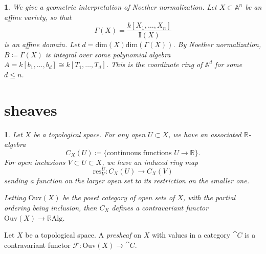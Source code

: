 \documentclass[12pt]{article}
\newtheorem{para}[theorem]{}
\begin{document}
\begin{para}
	We give a geometric interpretation of Noether normalization. Let $X\subset\mathbb{A}^n$ be an affine variety, so that 
	\begin{equation*}
		\Gamma(X)=\frac{k[X_1,\dots,X_n]}{\mathbf{I}(X)}
	\end{equation*}
	is an affine domain. Let $d=\text{dim}(X)\text{dim}(\Gamma(X))$. By Noether normalization, $B\coloneqq\Gamma(X)$ is integral over some polynomial algebra $A=k[b_1,\dots,b_d]\cong k[T_1,\dots,T_d]$. This is the coordinate ring of $\mathbb{A}^d$ for some $d\leq n$.
\end{para}


\section{sheaves} %

\begin{para}
	Let $X$ be a topological space. For any open $U\subset X$, we have an associated $\mathbb{R}$-algebra 
	\begin{equation*}
		C_X(U) \coloneqq \{ \text{continuous functions } U\to\mathbb{R} \}.
	\end{equation*}
	For open inclusions $V\subset U\subset X$, we have an induced ring map 
	\begin{equation*}
		\text{res}^U_V:C_X(U) \to C_X(V)
	\end{equation*}
	sending a function on the larger open set to its restriction on the smaller one.

	Letting $\text{Ouv}(X)$ be the poset category of open sets of $X$, with the partial ordering being inclusion, then $C_X$ defines a contravariant functor $\text{Ouv}(X)\to\mathbb{R}\text{Alg}$.
\end{para}

\begin{definition}
	Let $X$ be a topological space. A \emph{presheaf} on $X$ with values in a category $\cat{C}$ is a contravariant functor $\mathscr{F}:\text{Ouv}(X)\to\cat{C}$.
\end{definition}
\end{document}
